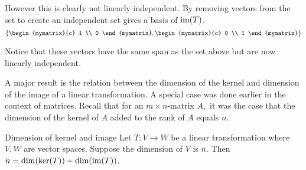 \begin{solution}
However this is clearly not linearly independent. By removing vectors from the set to create an independent set gives a basis of $\mbox{\rm im}(T)$.
\[
\set{
\begin{mymatrix}{c}
1 \\
0
\end{mymatrix},
\begin{mymatrix}{c}
0 \\
1
\end{mymatrix}
}
\]

Notice that these vectors have the same span as the set above but are now linearly independent.
\end{solution}

A major result is the relation between the dimension of the kernel and
dimension of the image of a linear transformation. A special case was done
earlier in the context of matrices. Recall that for an $m\times n$-matrix $%
A, $ it was the case that the dimension of the kernel of $A$ added to the
rank of $A$ equals $n$.

\begin{theorem}{Dimension of kernel and image}{}
Let $T:V\rightarrow W$ be a linear transformation where $V,W$ are vector
spaces. Suppose the dimension of $V$ is $n$.
Then $n=\dim (\ker (T)) +\dim (\mbox{\rm im}
(T))$.
\end{theorem}

